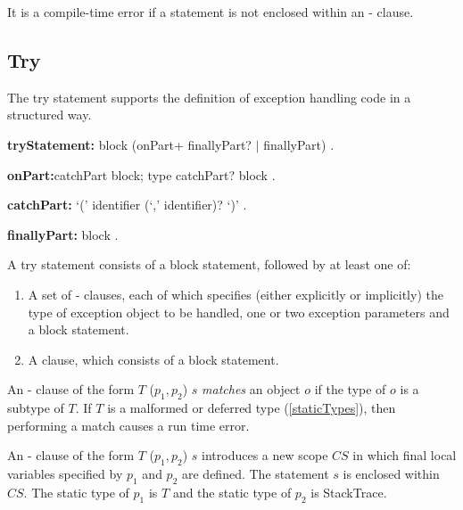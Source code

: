 \documentclass{article}
\newcommand{\code}[1]{{\sf #1}}
\begin{document}
\begin{itemize}
\LMHash{}
It is a compile-time error if a  \code{\RETHROW{}} statement is not enclosed within an \ON-\CATCH{} clause.



\subsection{ Try}

\LMHash{}
The try statement supports the definition of exception handling code in a structured way.

\begin{grammar}
{\bf tryStatement:}
      \TRY{} block (onPart+ finallyPart? $|$ finallyPart)
    .

 {\bf onPart:}catchPart block;
    \ON{} type catchPart? block
   .

{\bf catchPart:}
      \CATCH{} `(' identifier (`,' identifier)? `)'
    .

{\bf finallyPart:}
      \FINALLY{} block
    .
 \end{grammar}

\LMHash{}
 A try statement consists of a block statement, followed by at least one of:
 \begin{enumerate}
 \item
A set of \ON{}-\CATCH{} clauses, each of which specifies  (either explicitly or implicitly) the type of exception object to be handled, one or two exception parameters and a block statement.
\item
A \FINALLY{} clause, which consists of a block statement.
\end{enumerate}


\LMHash{}
An \ON{}-\CATCH{} clause of the form   \code{\ON{} $T$ \CATCH{} ($p_1, p_2$) $s$}  {\em matches} an object $o$  if the type of $o$ is a subtype of $T$.  If $T$ is a malformed or deferred type  (\ref{staticTypes}), then performing a match causes a run time error.


\LMHash{}
An \ON{}-\CATCH{} clause of the form   \code{\ON{} $T$ \CATCH{} ($p_1, p_2$) $s$} introduces a new scope $CS$ in which final local variables specified by $p_1$ and $p_2$ are defined. The statement $s$ is enclosed within $CS$. The static type of $p_1$ is $T$ and the static type of $p_2$ is \code{StackTrace}.



\end{itemize}
\end{document}
